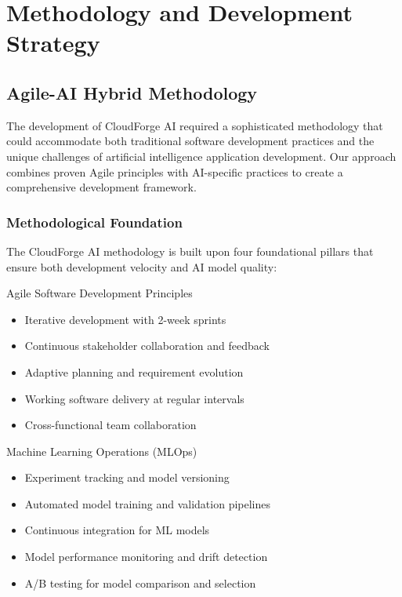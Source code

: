 \chapter{Methodology and Development Strategy}

\section{Agile-AI Hybrid Methodology}

The development of CloudForge AI required a sophisticated methodology that could accommodate both traditional software development practices and the unique challenges of artificial intelligence application development. Our approach combines proven Agile principles with AI-specific practices to create a comprehensive development framework.

\subsection{Methodological Foundation}

The CloudForge AI methodology is built upon four foundational pillars that ensure both development velocity and AI model quality:

\begin{sprintbox}{Agile Software Development Principles}
\begin{itemize}
    \item Iterative development with 2-week sprints
    \item Continuous stakeholder collaboration and feedback
    \item Adaptive planning and requirement evolution
    \item Working software delivery at regular intervals
    \item Cross-functional team collaboration
\end{itemize}
\end{sprintbox}

\begin{sprintbox}{Machine Learning Operations (MLOps)}
\begin{itemize}
    \item Experiment tracking and model versioning
    \item Automated model training and validation pipelines
    \item Continuous integration for ML models
    \item Model performance monitoring and drift detection
    \item A/B testing for model comparison and selection
\end{itemize}
\end{sprintbox}

